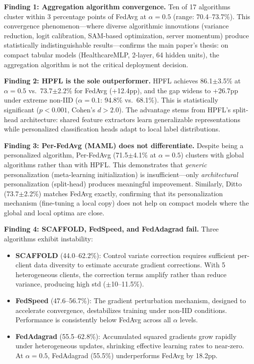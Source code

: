 \documentclass[conference]{IEEEtran}
\begin{document}
\noindent\textbf{Finding 1: Aggregation algorithm convergence.} Ten of 17 algorithms cluster within 3 percentage points of FedAvg at $\alpha{=}0.5$ (range: 70.4--73.7\%). This convergence phenomenon---where diverse algorithmic innovations (variance reduction, logit calibration, SAM-based optimization, server momentum) produce statistically indistinguishable results---confirms the main paper's thesis: on compact tabular models (HealthcareMLP, 2-layer, 64 hidden units), the aggregation algorithm is not the critical deployment decision.

\noindent\textbf{Finding 2: HPFL is the sole outperformer.} HPFL achieves 86.1$\pm$3.5\% at $\alpha{=}0.5$ vs.\ 73.7$\pm$2.2\% for FedAvg (+12.4pp), and the gap widens to +26.7pp under extreme non-IID ($\alpha{=}0.1$: 94.8\% vs.\ 68.1\%). This is statistically significant ($p{<}0.001$, Cohen's $d{>}2.0$). The advantage stems from HPFL's split-head architecture: shared feature extractors learn generalizable representations while personalized classification heads adapt to local label distributions.

\noindent\textbf{Finding 3: Per-FedAvg (MAML) does not differentiate.} Despite being a personalized algorithm, Per-FedAvg (71.5$\pm$4.1\% at $\alpha{=}0.5$) clusters with global algorithms rather than with HPFL. This demonstrates that \textit{generic} personalization (meta-learning initialization) is insufficient---only \textit{architectural} personalization (split-head) produces meaningful improvement. Similarly, Ditto (73.7$\pm$2.2\%) matches FedAvg exactly, confirming that its personalization mechanism (fine-tuning a local copy) does not help on compact models where the global and local optima are close.

\noindent\textbf{Finding 4: SCAFFOLD, FedSpeed, and FedAdagrad fail.} Three algorithms exhibit instability:
\begin{itemize}
    \item \textbf{SCAFFOLD} (44.0--62.2\%): Control variate correction requires sufficient per-client data diversity to estimate accurate gradient corrections. With 5 heterogeneous clients, the correction terms amplify rather than reduce variance, producing high std ($\pm$10--11.5\%).
    \item \textbf{FedSpeed} (47.6--56.7\%): The gradient perturbation mechanism, designed to accelerate convergence, destabilizes training under non-IID conditions. Performance is consistently below FedAvg across all $\alpha$ levels.
    \item \textbf{FedAdagrad} (55.5--62.8\%): Accumulated squared gradients grow rapidly under heterogeneous updates, shrinking effective learning rates to near-zero. At $\alpha{=}0.5$, FedAdagrad (55.5\%) underperforms FedAvg by 18.2pp.
\end{itemize}
\end{document}

